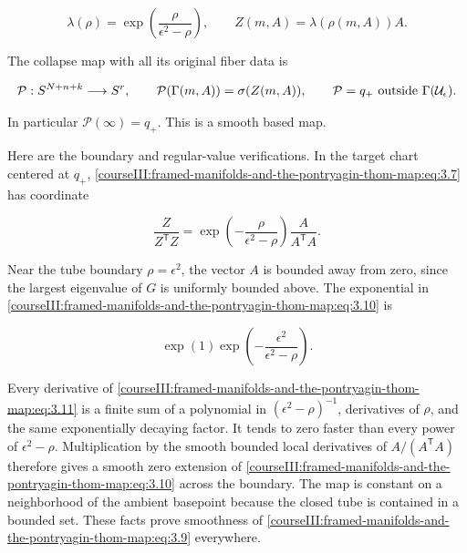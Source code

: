 \begin{equation}
\lambda(\rho)=\exp\!\left(\frac{\rho}{\epsilon^2-\rho}\right),
 \qquad Z(m,A)=\lambda(\rho(m,A))A.
 \label{courseIII:framed-manifolds-and-the-pontryagin-thom-map:eq:3.8}
\end{equation}

The collapse map with all its original fiber data is

\begin{equation}
\mathcal P:S^{N+n+k}\longrightarrow S^r,\qquad
 \mathcal P(\Gamma(m,A))=\sigma(Z(m,A)),\qquad
 \mathcal P=q_+\ \hbox{outside }\Gamma(\mathcal U_\epsilon).
 \label{courseIII:framed-manifolds-and-the-pontryagin-thom-map:eq:3.9}
\end{equation}

In particular \(\mathcal P(\infty)=q_+\). This is a smooth based map.

Here are the boundary and regular-value verifications. In the target chart centered at \(q_+\), \eqref{courseIII:framed-manifolds-and-the-pontryagin-thom-map:eq:3.7} has coordinate

\begin{equation}
\frac{Z}{Z^{\mathsf T}Z}
  =\exp\!\left(-\frac{\rho}{\epsilon^2-\rho}\right)
                   \frac{A}{A^{\mathsf T}A}.
 \label{courseIII:framed-manifolds-and-the-pontryagin-thom-map:eq:3.10}
\end{equation}

Near the tube boundary \(\rho=\epsilon^2\), the vector \(A\) is bounded away from zero, since the largest eigenvalue of \(G\) is uniformly bounded above. The exponential in \eqref{courseIII:framed-manifolds-and-the-pontryagin-thom-map:eq:3.10} is

\begin{equation}
\exp(1)\exp\!\left(-\frac{\epsilon^2}{\epsilon^2-\rho}\right).
 \label{courseIII:framed-manifolds-and-the-pontryagin-thom-map:eq:3.11}
\end{equation}

Every derivative of \eqref{courseIII:framed-manifolds-and-the-pontryagin-thom-map:eq:3.11} is a finite sum of a polynomial in
\((\epsilon^2-\rho)^{-1}\), derivatives of \(\rho\), and the same exponentially decaying factor. It tends to zero faster than every power of \(\epsilon^2-\rho\). Multiplication by the smooth bounded local derivatives of \(A/(A^{\mathsf T}A)\) therefore gives a smooth zero extension of \eqref{courseIII:framed-manifolds-and-the-pontryagin-thom-map:eq:3.10} across the boundary. The map is constant on a neighborhood of the ambient basepoint because the closed tube is contained in a bounded set. These facts prove smoothness of \eqref{courseIII:framed-manifolds-and-the-pontryagin-thom-map:eq:3.9} everywhere.

